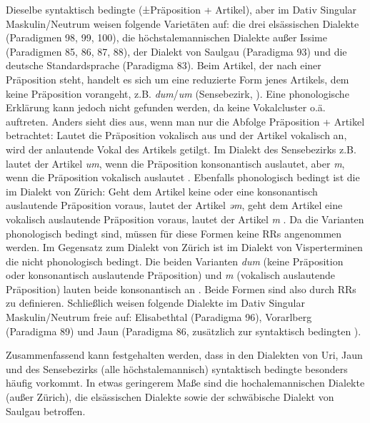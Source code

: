 Dieselbe syntaktisch bedingte  (±Präposition + Artikel), aber im Dativ Singular Maskulin/Neutrum weisen folgende Varietäten auf: die drei elsässischen Dialekte (Paradigmen 98, 99, 100), die höchstalemannischen Dialekte außer Issime (Paradigmen 85, 86, 87, 88), der Dialekt von Saulgau (Paradigma 93) und die deutsche Standardsprache (Paradigma 83). Beim Artikel, der nach einer Präposition steht, handelt es sich um eine reduzierte Form jenes Artikels, dem keine Präposition vorangeht, z.B. \textit{dum}/\textit{um} (Sensebezirk, \citealt[200]{Henzen1927}). Eine phonologische Erklärung kann jedoch nicht gefunden werden, da keine Vokalcluster o.ä. auftreten. Anders sieht dies aus, wenn man nur die Abfolge Präposition + Artikel betrachtet: Lautet die Präposition vokalisch aus und der Artikel vokalisch an, wird der anlautende Vokal des Artikels getilgt. Im Dialekt des Sensebezirks z.B. lautet der Artikel \textit{um}, wenn die Präposition konsonantisch auslautet, aber \textit{m}, wenn die Präposition vokalisch auslautet \citep[200]{Henzen1927}. Ebenfalls phonologisch bedingt ist die  im Dialekt von Zürich: Geht dem Artikel keine oder eine konsonantisch auslautende Präposition voraus, lautet der Artikel \textit{əm}, geht dem Artikel eine vokalisch auslautende Präposition voraus, lautet der Artikel \textit{m} \citep[103]{Weber1987}. Da die Varianten phonologisch bedingt sind, müssen für diese Formen keine RRs angenommen werden. Im Gegensatz zum Dialekt von Zürich ist im Dialekt von Visperterminen die  nicht phonologisch bedingt. Die beiden Varianten \textit{dum} (keine Präposition oder konsonantisch auslautende Präposition) und \textit{m} (vokalisch auslautende Präposition) lauten beide konsonantisch an \citet[141-142]{Wipf1911}. Beide Formen sind also durch RRs zu definieren. Schließlich weisen folgende Dialekte im Dativ Singular Maskulin/Neutrum freie  auf: Elisabethtal (Paradigma 96), Vorarlberg (Paradigma 89) und Jaun (Paradigma 86, zusätzlich zur syntaktisch bedingten ).

Zusammenfassend kann festgehalten werden, dass in den Dialekten von Uri, Jaun und des Sensebezirks (alle höchstalemannisch) syntaktisch bedingte  besonders häufig vorkommt. In etwas geringerem Maße sind die hochalemannischen Dialekte (außer Zürich), die elsässischen Dialekte sowie der schwäbische Dialekt von Saulgau betroffen.


